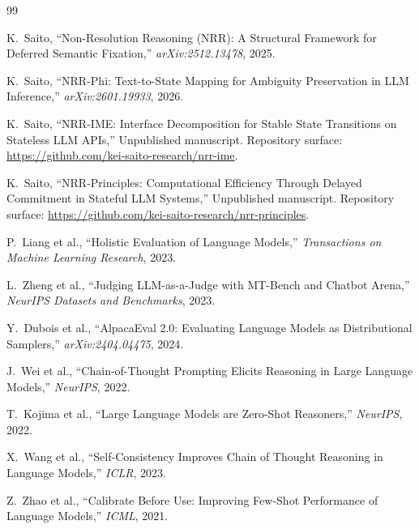 \documentclass[11pt,a4paper]{article}
\begin{document}
\begin{thebibliography}{99}

K.~Saito,
\newblock ``Non-Resolution Reasoning (NRR): A Structural Framework for Deferred Semantic Fixation,''
\newblock \emph{arXiv:2512.13478}, 2025.

K.~Saito,
\newblock ``NRR-Phi: Text-to-State Mapping for Ambiguity Preservation in LLM Inference,''
\newblock \emph{arXiv:2601.19933}, 2026.

K.~Saito,
\newblock ``NRR-IME: Interface Decomposition for Stable State Transitions on Stateless LLM APIs,''
\newblock Unpublished manuscript. Repository surface:
\url{https://github.com/kei-saito-research/nrr-ime}.

K.~Saito,
\newblock ``NRR-Principles: Computational Efficiency Through Delayed Commitment in Stateful LLM Systems,''
\newblock Unpublished manuscript. Repository surface:
\url{https://github.com/kei-saito-research/nrr-principles}.

P.~Liang et al.,
\newblock ``Holistic Evaluation of Language Models,''
\newblock \emph{Transactions on Machine Learning Research}, 2023.

L.~Zheng et al.,
\newblock ``Judging LLM-as-a-Judge with MT-Bench and Chatbot Arena,''
\newblock \emph{NeurIPS Datasets and Benchmarks}, 2023.

Y.~Dubois et al.,
\newblock ``AlpacaEval 2.0: Evaluating Language Models as Distributional Samplers,''
\newblock \emph{arXiv:2404.04475}, 2024.

J.~Wei et al.,
\newblock ``Chain-of-Thought Prompting Elicits Reasoning in Large Language Models,''
\newblock \emph{NeurIPS}, 2022.

T.~Kojima et al.,
\newblock ``Large Language Models are Zero-Shot Reasoners,''
\newblock \emph{NeurIPS}, 2022.

X.~Wang et al.,
\newblock ``Self-Consistency Improves Chain of Thought Reasoning in Language Models,''
\newblock \emph{ICLR}, 2023.

Z.~Zhao et al.,
\newblock ``Calibrate Before Use: Improving Few-Shot Performance of Language Models,''
\newblock \emph{ICML}, 2021.

\end{thebibliography}
\end{document}
